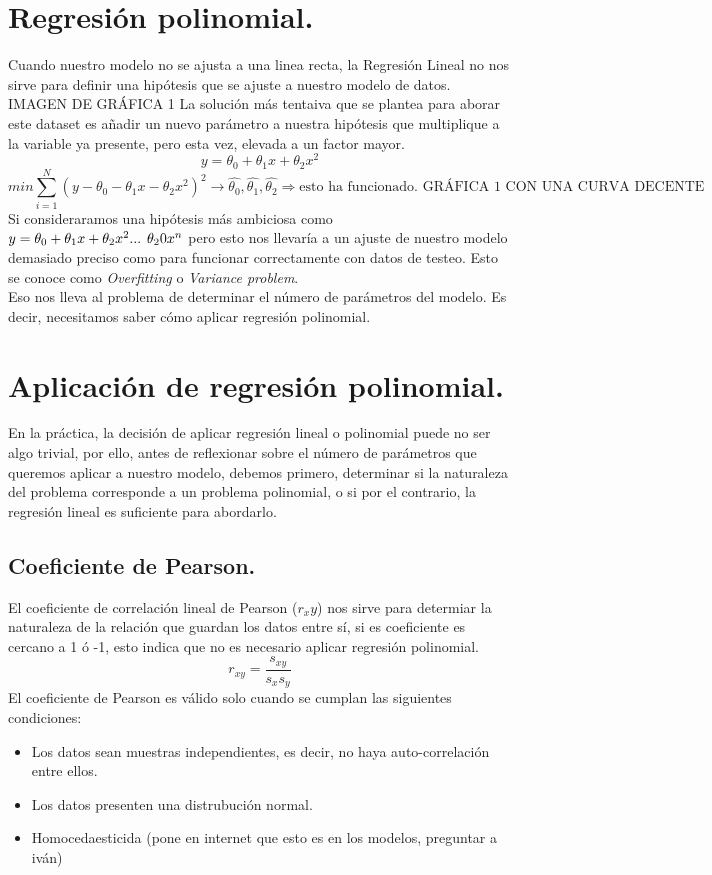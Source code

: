 \documentclass[a4paper,10pt]{article}
\begin{document}
\section{Regresión polinomial.}
\noindent
Cuando nuestro modelo no se ajusta a una linea recta, la Regresión Lineal no nos sirve para definir una hipótesis que se ajuste a nuestro modelo de datos.
IMAGEN DE GRÁFICA 1
La solución más tentaiva que se plantea para aborar este dataset es añadir un nuevo parámetro a nuestra hipótesis que multiplique a la variable ya presente, pero esta vez, elevada a un factor mayor. 
\[
 y=\theta_0+\theta_1 x+\theta_2 x^2
\]
\[
 min\sum_{i=1}^{N}(y-\theta_0-\theta_1 x-\theta_2 x^2)^2\longrightarrow \hat{\theta_0},\hat{\theta_1},\hat{\theta_2} \Rightarrow \text{esto ha funcionado. GRÁFICA 1 CON UNA CURVA DECENTE}
\] 
Si consideraramos una hipótesis más ambiciosa como $y=\theta_0+\theta_1 x+\theta_2 x^2 ...\hspace{0.15cm} \theta_20 x^n$ pero esto nos llevaría a un ajuste de nuestro modelo demasiado preciso como para funcionar correctamente con datos de testeo. Esto se conoce como \textit{Overfitting} o \textit{Variance problem}.
\\Eso nos lleva al problema de determinar el número de parámetros del modelo. Es decir, necesitamos saber cómo aplicar regresión polinomial.
\section{Aplicación de regresión polinomial.}
\noindent
En la práctica, la decisión de aplicar regresión lineal o polinomial puede no ser algo trivial, por ello, antes de reflexionar sobre el número de parámetros que queremos aplicar a nuestro modelo, debemos primero, determinar si la naturaleza del problema corresponde a un problema polinomial, o si por el contrario, la regresión lineal es suficiente para abordarlo.
\subsection{Coeficiente de Pearson.}
\noindent
El coeficiente de correlación lineal de Pearson ($r_xy$) nos sirve para determiar la naturaleza de la relación que guardan los datos entre sí, si es coeficiente es cercano a 1 ó -1, esto indica que no es necesario aplicar regresión polinomial.
\[
r_{xy}=\frac{s_{xy}}{s_x s_y}
\]
El coeficiente de Pearson es válido solo cuando se cumplan las siguientes condiciones:
\begin{itemize}
    \item Los datos sean muestras independientes, es decir, no haya auto-correlación entre ellos.
    \item Los datos presenten una distrubución normal.
    \item Homocedaesticida (pone en internet que esto es en los modelos, preguntar a iván)
\end{itemize}
\end{document}
